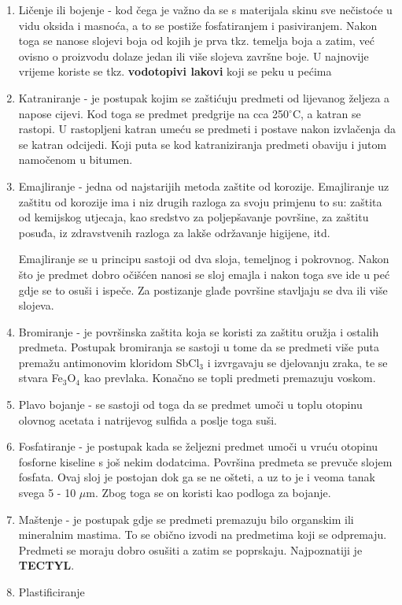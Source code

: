 \documentclass[a4paper,12pt]{article}
\numberwithin{figure}{section}
\begin{document}
\begin{enumerate}
\item Ličenje ili bojenje - kod čega je važno da se s materijala skinu sve nečistoće u vidu oksida i masnoća, a to se postiže fosfatiranjem i pasiviranjem. Nakon toga se nanose slojevi boja od kojih je prva tkz. temelja boja a zatim, već ovisno o proizvodu dolaze jedan ili više slojeva završne boje. U najnovije vrijeme koriste se tkz. \textbf{vodotopivi lakovi} koji se peku u pećima
\item Katraniranje - je postupak kojim se zaštićuju predmeti od lijevanog željeza a napose cijevi. Kod toga se predmet predgrije na cca 250$^{\circ}$C, a katran se rastopi. U rastopljeni katran umeću se predmeti i postave nakon izvlačenja da se katran odcijedi. Koji puta se kod katraniziranja predmeti obaviju i jutom namočenom u bitumen.
\item Emajliranje - jedna od najstarijih metoda zaštite od korozije. Emajliranje uz zaštitu od korozije ima i niz drugih razloga za svoju primjenu to su: zaštita od kemijskog utjecaja, kao sredstvo za poljepšavanje površine, za zaštitu posuđa, iz zdravstvenih razloga za lakše održavanje higijene, itd.\par
Emajliranje se u principu sastoji od dva sloja, temeljnog i pokrovnog. Nakon što je predmet dobro očišćen nanosi se sloj emajla i nakon toga sve ide u peć gdje se to osuši i ispeče. Za postizanje glađe površine stavljaju se dva ili više slojeva.
\item Bromiranje - je površinska zaštita koja se koristi za zaštitu oružja i ostalih predmeta. Postupak bromiranja se sastoji u tome da se predmeti više puta premažu antimonovim kloridom SbCl$_{3}$ i izvrgavaju se djelovanju zraka, te se stvara Fe$_{3}$O$_{4}$ kao prevlaka. Konačno se topli predmeti premazuju voskom.
\item Plavo bojanje - se sastoji od toga da se predmet umoči u toplu otopinu olovnog acetata i natrijevog sulfida a poslje toga suši.
\item Fosfatiranje - je postupak kada se željezni predmet umoči u vruću otopinu fosforne kiseline s još nekim dodatcima. Površina predmeta se prevuče slojem fosfata. Ovaj sloj je postojan dok ga se ne ošteti, a uz to je i veoma tanak svega 5 - 10 $\mu$m. Zbog toga se on koristi kao podloga za bojanje.
\item Maštenje - je postupak gdje se predmeti premazuju bilo organskim ili mineralnim mastima. To se obično izvodi na predmetima koji se odpremaju. Predmeti se moraju dobro osušiti a zatim se poprskaju. Najpoznatiji je \textbf{TECTYL}. 
\item Plastificiranje
\end{enumerate} 
\end{document}
